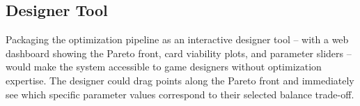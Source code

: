 \subsection{Designer Tool}

Packaging the optimization pipeline as an interactive designer tool -- with a web dashboard showing the Pareto front, card viability plots, and parameter sliders -- would make the system accessible to game designers without optimization expertise. The designer could drag points along the Pareto front and immediately see which specific parameter values correspond to their selected balance trade-off.
